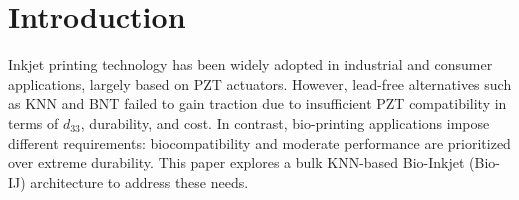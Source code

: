 \section{Introduction}
Inkjet printing technology has been widely adopted in industrial and
consumer applications, largely based on PZT actuators.
However, lead-free alternatives such as KNN and BNT failed to gain
traction due to insufficient PZT compatibility in terms of $d_{33}$,
durability, and cost.
In contrast, bio-printing applications impose different requirements:
biocompatibility and moderate performance are prioritized over extreme
durability.
This paper explores a bulk KNN-based Bio-Inkjet (Bio-IJ) architecture
to address these needs.
